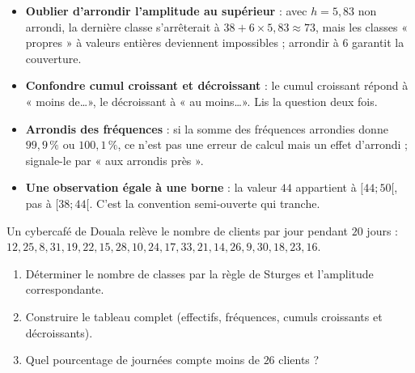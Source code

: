 \documentclass[11pt]{article}
\begin{document}
\begin{attention}
\begin{itemize}
\item \textbf{Oublier d'arrondir l'amplitude au supérieur} : avec $h = 5{,}83$ non arrondi, la dernière classe s'arrêterait à $38 + 6 \times 5{,}83 \approx 73$, mais les classes « propres » à valeurs entières deviennent impossibles ; arrondir à $6$ garantit la couverture.
\item \textbf{Confondre cumul croissant et décroissant} : le cumul croissant répond à « moins de\ldots », le décroissant à « au moins\ldots ». Lis la question deux fois.
\item \textbf{Arrondis des fréquences} : si la somme des fréquences arrondies donne $99{,}9\,\%$ ou $100{,}1\,\%$, ce n'est pas une erreur de calcul mais un effet d'arrondi ; signale-le par « aux arrondis près ».
\item \textbf{Une observation égale à une borne} : la valeur $44$ appartient à $[44;50[$, pas à $[38;44[$. C'est la convention semi-ouverte qui tranche.
\end{itemize}
\end{attention}

\begin{exercice}
Un cybercafé de Douala relève le nombre de clients par jour pendant $20$ jours :
$12, 25, 8, 31, 19, 22, 15, 28, 10, 24, 17, 33, 21, 14, 26, 9, 30, 18, 23, 16$.
\begin{enumerate}
\item Déterminer le nombre de classes par la règle de Sturges et l'amplitude correspondante.
\item Construire le tableau complet (effectifs, fréquences, cumuls croissants et décroissants).
\item Quel pourcentage de journées compte moins de $26$ clients ?
\end{enumerate}
\end{exercice}
\end{document}
